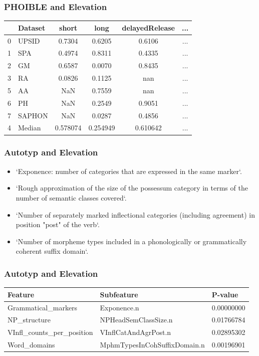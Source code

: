 \documentclass{beamer}
\begin{document}
\begin{frame}
\frametitle{PHOIBLE and Elevation}
\begin{tabular}{llcccc}
\toprule
{} & Dataset &     short &      long & delayedRelease & ... \\
\midrule
0 &   UPSID &    0.7304 &    0.6205 &         0.6106 &    ... \\
1 &     SPA &    0.4974 &    0.8311 &         0.4335 &    ... \\
2 &      GM &    0.6587 &    0.0070 &         0.8435 &    ... \\
3 &      RA &    0.0826 &    0.1125 &            nan &    ... \\
5 &      AA &       NaN &    0.7559 &            nan &    ... \\
6 &      PH &       NaN &    0.2549 &         0.9051 &    ... \\
7 &  SAPHON &       NaN &    0.0287 &         0.4856 &    ... \\
\midrule
4 &  Median &  0.578074 &  0.254949 &       0.610642 &    ... \\
\bottomrule
\end{tabular}
\end{frame}

\begin{frame}
\frametitle{Autotyp and Elevation}
\begin{itemize}
 \item `Exponence: number of categories that are expressed in the same marker`.
 \item `Rough approximation of the size of the possessum category in terms of the number of semantic classes covered`.
 \item `Number of separately marked inflectional categories (including agreement) in position "post" of the verb`.
 \item `Number of morpheme types included in a phonologically or grammatically coherent suffix domain`.
\end{itemize}
\end{frame}

\begin{frame}
\frametitle{Autotyp and Elevation}
\begin{adjustbox}{max width=\textwidth}
\begin{tabular}{lll}
\toprule
Feature &                    Subfeature &     P-value \\
\midrule
Grammatical\_markers &                   Exponence.n &  0.00000000 \\
NP\_structure &          NPHeadSemClassSize.n &  0.01766784 \\
VInfl\_counts\_per\_position &          VInflCatAndAgrPost.n &  0.02895302 \\
Word\_domains &  MphmTypesInCohSuffixDomain.n &  0.00196901 \\
\bottomrule
\end{tabular}
\end{adjustbox}
\end{frame}
\end{document}
